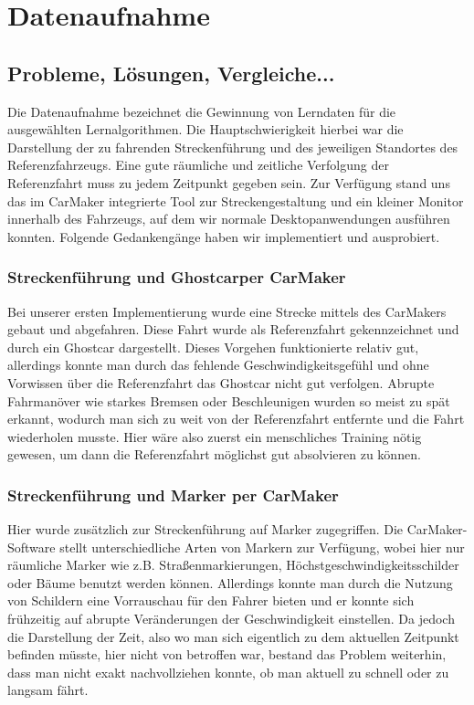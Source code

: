 
\chapter{Datenaufnahme} %
\label{cha:Datenaufnahme}

\section{Probleme, Lösungen, Vergleiche...} %
\label{sec:Probleme_Loesungen_Vergleiche}
Die Datenaufnahme bezeichnet die Gewinnung von Lerndaten für die ausgewählten Lernalgorithmen. Die Hauptschwierigkeit hierbei war die Darstellung der zu fahrenden Streckenführung und des jeweiligen Standortes des Referenzfahrzeugs. Eine gute räumliche und zeitliche Verfolgung der Referenzfahrt muss zu jedem Zeitpunkt gegeben sein. Zur Verfügung stand uns das im CarMaker integrierte Tool zur Streckengestaltung und ein kleiner Monitor innerhalb des Fahrzeugs, auf dem wir normale Desktopanwendungen ausführen konnten. Folgende Gedankengänge haben wir implementiert und ausprobiert.

\subsection{Streckenführung und \glqq Ghostcar\grqq per CarMaker}
\label{sec:Probleme_Loesungen_Vergleiche_ss1}
Bei unserer ersten Implementierung wurde eine Strecke mittels des CarMakers gebaut und abgefahren. Diese Fahrt wurde als Referenzfahrt gekennzeichnet und durch ein Ghostcar dargestellt.
Dieses Vorgehen funktionierte relativ gut, allerdings konnte man durch das fehlende Geschwindigkeitsgefühl und ohne Vorwissen über die Referenzfahrt das Ghostcar nicht gut verfolgen. Abrupte Fahrmanöver wie starkes Bremsen oder Beschleunigen wurden so meist zu spät erkannt, wodurch man sich zu weit von der Referenzfahrt entfernte und die Fahrt wiederholen musste. Hier wäre also zuerst ein menschliches Training nötig gewesen, um dann die Referenzfahrt möglichst gut absolvieren zu können.

\subsection{Streckenführung und Marker per CarMaker}
\label{sec:Probleme_Loesungen_Vergleiche_ss2}
Hier wurde zusätzlich zur Streckenführung auf Marker zugegriffen. Die CarMaker-Software stellt unterschiedliche Arten von Markern zur Verfügung, wobei hier nur räumliche Marker wie z.B.  Straßenmarkierungen, Höchstgeschwindigkeitsschilder oder Bäume benutzt werden können. Allerdings konnte man durch die Nutzung von Schildern eine Vorrauschau für den Fahrer bieten und er konnte sich frühzeitig auf abrupte Veränderungen der Geschwindigkeit einstellen. Da jedoch die Darstellung der Zeit, also wo man sich eigentlich zu dem aktuellen Zeitpunkt befinden müsste, hier nicht von betroffen war, bestand das Problem weiterhin, dass man nicht exakt nachvollziehen konnte, ob man aktuell zu schnell oder zu langsam fährt.

